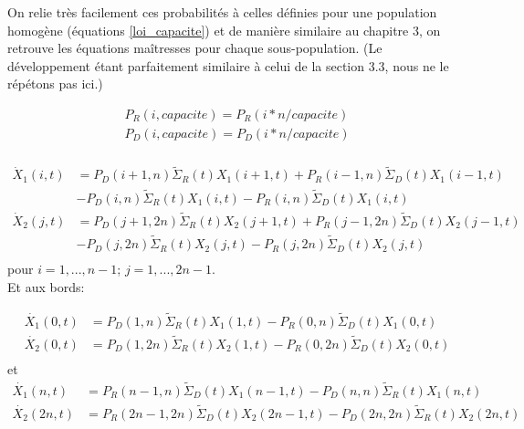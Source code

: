 On relie très facilement ces  probabilités à celles définies pour une population homogène (équations \ref{loi_capacite}) et de manière similaire au chapitre 3, on retrouve les équations maîtresses pour chaque sous-population. (Le développement étant parfaitement similaire à celui de la section 3.3, nous ne le répétons pas ici.)

\begin{equation}
\begin{aligned}
P_{R}(i,capacite)=P_{R}(i*n/capacite)\\
P_{D}(i,capacite)=P_{D}(i*n/capacite)\\
\end{aligned}
\label{loi_capacite}
\end{equation}







\begin{equation}
\begin{aligned}
\dot{X}_1(i,t) &= P_D(i+1,n) \tilde{\Sigma}_R(t) X_1(i+1,t) + P_R(i-1,n) \tilde{\Sigma}_D(t) X_1(i-1,t)\\
					&-P_D(i,n) \tilde{\Sigma}_R(t) X_1(i,t) -P_R(i,n) \tilde{\Sigma}_D(t) X_1(i,t)\\
\dot{X}_2(j,t) &= P_D(j+1,2n) \tilde{\Sigma}_R(t) X_2(j+1,t) + P_R(j-1,2n) \tilde{\Sigma}_D(t) X_2(j-1,t)\\
					&-P_D(j,2n) \tilde{\Sigma}_R(t) X_2(j,t) -P_R(j,2n) \tilde{\Sigma}_D(t) X_2(j,t)\\		
\label{maitressebis}
\end{aligned}
\end{equation}
pour $i = 1,...,n-1$; $j=1,...,2n-1$.\\

Et aux bords:

\begin{equation}
\begin{aligned}
\dot{X_1}(0,t)&= P_D(1,n) \tilde{\Sigma}_R(t) X_1(1,t) - P_R(0,n) \tilde{\Sigma}_D(t) X_1(0,t)\\
\dot{X_2}(0,t)&= P_D(1,2n) \tilde{\Sigma}_R(t) X_2(1,t) - P_R(0,2n) \tilde{\Sigma}_D(t) X_2(0,t)\\
\label{bord0bis}
\end{aligned}
\end{equation}
 et 
\begin{equation}
\begin{aligned}
\dot{X_1}(n,t)&= P_R(n-1,n) \tilde{\Sigma}_D(t) X_1(n-1,t)- P_D(n,n) \tilde{\Sigma}_R(t) X_1(n,t)\\
\dot{X_2}(2n,t)&= P_R(2n-1,2n) \tilde{\Sigma}_D(t) X_2(2n-1,t)- P_D(2n,2n) \tilde{\Sigma}_R(t) X_2(2n,t)\\
\label{bordNbis}
\end{aligned}
\end{equation}

